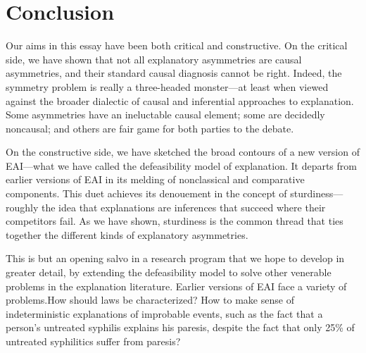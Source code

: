 \documentclass[natbib]{svjour3}                     %
\newcounter{fncntr}
\newcommand{\fnmark}[1]{\refstepcounter{fncntr}\label{#1}\footnotemark[\getrefnumber{#1}]}
\newcommand{\fntext}[2]{\footnotetext[\getrefnumber{#1}]{#2}}
\newcommand{\kk}[1]{\textcolor{red}{$^{\textrm{KK}}${#1}}}
\begin{document}
%	
%	
%
%

\section{Conclusion}
Our aims in this essay have been both critical and constructive. On the critical side, we have shown that not all explanatory asymmetries are causal asymmetries, and their standard causal diagnosis cannot be right. Indeed, the symmetry problem is really a three-headed monster---at least when viewed against the broader dialectic of causal and inferential approaches to explanation. Some asymmetries have an ineluctable causal element; some are decidedly noncausal; and others are fair game for both parties to the debate.

On the constructive side, we have sketched the broad contours of a new version of EAI---what we have called the defeasibility model of explanation. It departs from earlier versions of EAI in its melding of nonclassical and comparative components. This duet achieves its denouement in the concept of sturdiness---roughly the idea that explanations are inferences that succeed where their competitors fail. As we have shown, sturdiness is the common thread that ties together the different kinds of explanatory asymmetries.

This is but an opening salvo in a research program that we hope to develop in greater detail, by extending the defeasibility model to solve other venerable problems in the explanation literature. Earlier versions of EAI face a variety of problems.\fnmark{Challenges} How should laws be characterized? How to make sense of indeterministic explanations of improbable events, such as the fact that a person's untreated syphilis explains his paresis, despite the fact that only 25\% of untreated syphilitics suffer from paresis?
\end{document}
